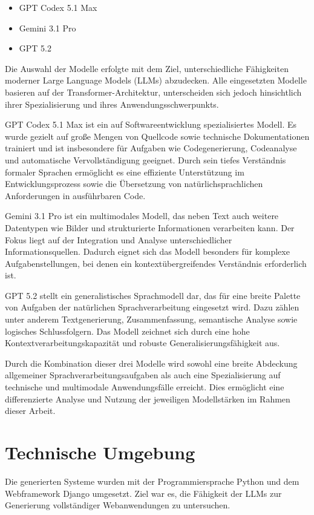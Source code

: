 \begin{itemize}
\item GPT Codex 5.1 Max
\item Gemini 3.1 Pro
\item GPT 5.2
\end{itemize}

Die Auswahl der Modelle erfolgte mit dem Ziel, unterschiedliche Fähigkeiten moderner Large Language Models (LLMs) abzudecken. Alle eingesetzten Modelle basieren auf der Transformer-Architektur, unterscheiden sich jedoch hinsichtlich ihrer Spezialisierung und ihres Anwendungsschwerpunkts.

GPT Codex 5.1 Max ist ein auf Softwareentwicklung spezialisiertes Modell. Es wurde gezielt auf große Mengen von Quellcode sowie technische Dokumentationen trainiert und ist insbesondere für Aufgaben wie Codegenerierung, Codeanalyse und automatische Vervollständigung geeignet. Durch sein tiefes Verständnis formaler Sprachen ermöglicht es eine effiziente Unterstützung im Entwicklungsprozess sowie die Übersetzung von natürlichsprachlichen Anforderungen in ausführbaren Code.

Gemini 3.1 Pro ist ein multimodales Modell, das neben Text auch weitere Datentypen wie Bilder und strukturierte Informationen verarbeiten kann. Der Fokus liegt auf der Integration und Analyse unterschiedlicher Informationsquellen. Dadurch eignet sich das Modell besonders für komplexe Aufgabenstellungen, bei denen ein kontextübergreifendes Verständnis erforderlich ist.

GPT 5.2 stellt ein generalistisches Sprachmodell dar, das für eine breite Palette von Aufgaben der natürlichen Sprachverarbeitung eingesetzt wird. Dazu zählen unter anderem Textgenerierung, Zusammenfassung, semantische Analyse sowie logisches Schlussfolgern. Das Modell zeichnet sich durch eine hohe Kontextverarbeitungskapazität und robuste Generalisierungsfähigkeit aus.

Durch die Kombination dieser drei Modelle wird sowohl eine breite Abdeckung allgemeiner Sprachverarbeitungsaufgaben als auch eine Spezialisierung auf technische und multimodale Anwendungsfälle erreicht. Dies ermöglicht eine differenzierte Analyse und Nutzung der jeweiligen Modellstärken im Rahmen dieser Arbeit.

\section{Technische Umgebung}

Die generierten Systeme wurden mit der Programmiersprache
Python und dem Webframework Django umgesetzt. Ziel war es,
die Fähigkeit der LLMs zur Generierung vollständiger
Webanwendungen zu untersuchen.

